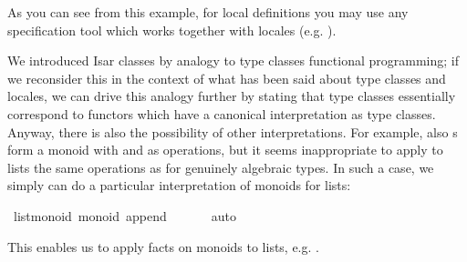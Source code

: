 \begin{isabellebody}
\begin{isamarkuptext}
  \noindent As you can see from this example, for local
  definitions you may use any specification tool
  which works together with locales (e.g. \cite{krauss2006}).%
\end{isamarkuptext}%
\isamarkuptrue%
%
\isamarkuptrue%
%
\begin{isamarkuptext}%
We introduced Isar classes by analogy to type classes
  functional programming;  if we reconsider this in the
  context of what has been said about type classes and locales,
  we can drive this analogy further by stating that type
  classes essentially correspond to functors which have
  a canonical interpretation as type classes.
  Anyway, there is also the possibility of other interpretations.
  For example, also s form a monoid with
   and \isa{{\isacharbrackleft}{\isacharbrackright}} as operations, but it
  seems inappropriate to apply to lists
  the same operations as for genuinely algebraic types.
  In such a case, we simply can do a particular interpretation
  of monoids for lists:%
\end{isamarkuptext}%
\isamarkuptrue%
%
\isadelimquote
%
\endisadelimquote
%
\isatagquote
{}\isamarkupfalse%
\ list{\isacharunderscore}monoid{\isacharbang}{\isacharcolon}\ monoid\ append\ {\isachardoublequoteopen}{\isacharbrackleft}{\isacharbrackright}{\isachardoublequoteclose}\isanewline
\ \ \isamarkupfalse%
\ \isamarkupfalse%
\ auto%
\endisatagquote
{\isafoldquote}%
%
\isadelimquote
%
\endisadelimquote
%
\begin{isamarkuptext}%
\noindent This enables us to apply facts on monoids
  to lists, e.g. .


\end{isamarkuptext}
\end{isabellebody}
